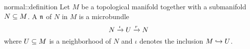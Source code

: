 \begin{mydefinition}{normal::definition}
    Let $M$ be a topological manifold together with a submanifold $N \subseteq{} M$.
    A  $\mathfrak{n}$ of $N$ in $M$ is a microbundle
    \[ N \xrightarrow{\iota} U \xrightarrow{r} N{} \]
    where $U \subseteq{} M$ is a neighborhood of $N$ and $\iota$ denotes the inclusion $M \hookrightarrow{} U$.
\end{mydefinition}